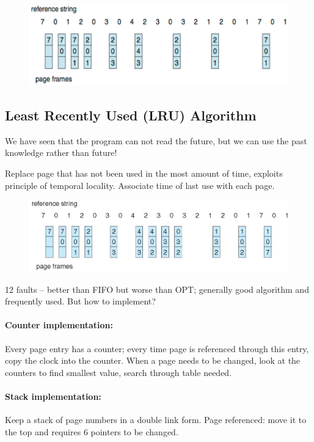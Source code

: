 \begin{figure}[htbp]
    \centering
    \includegraphics[width=0.77\linewidth]{img/dng.png}
\end{figure}

\newpage
\subsection{Least Recently Used (LRU) Algorithm}

We have seen that the program can not read the future, but we can use the past knowledge rather than future! 

Replace page that has not been used in the most amount of time, exploits principle of temporal locality. Associate time of last use with each page.

\begin{figure}[htbp]
    \centering
    \includegraphics[width=0.8\linewidth]{img/fdb.png}
\end{figure}

12 faults – better than FIFO but worse than OPT; generally good algorithm and frequently used. But how to implement?

\paragraph{Counter implementation: } Every page entry has a counter; every time page is referenced
through this entry, copy the clock into the counter. When a page needs to be changed, look at the counters to find
smallest value, search through table needed.

\paragraph{Stack implementation: } Keep a stack of page numbers in a double link form. Page referenced: move it to the top and requires 6 pointers to be changed.

